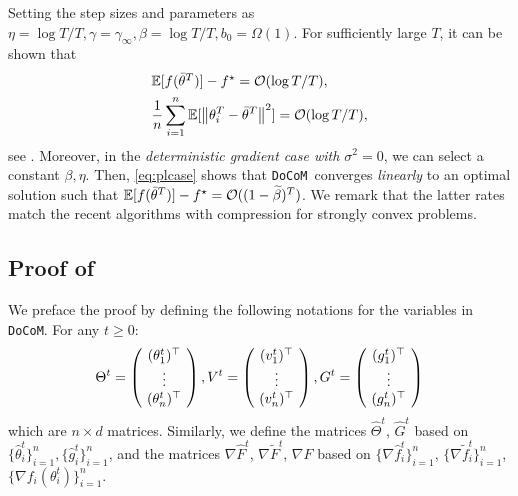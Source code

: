 \documentclass[10pt]{article} %
\theoremstyle{plain}
\theoremstyle{definition}
\theoremstyle{remark}
\newcommand{\aname}{{\tt DoCoM}}
\newcommand{\RR}{\mathbb{R}}
\newcommand{\prm}{\theta}
\newcommand{\gog}{g}
\newcommand{\hatgog}{\widehat{\gog}}
\newcommand{\grdF}{\nabla F}
\newcommand{\avgtheta}{\bar{\prm}}
\newcommand{\norm}[1]{\left\| #1 \right\|}
\newcommand{\ve}{v}
\newcommand{\stocgrdf}{\nabla \widehat{f}}
\newcommand{\stocgrdfp}{\nabla \widetilde{f}}
\newcommand{\stocgrdF}{\nabla \widehat{F}}
\newcommand{\stocgrdFp}{\nabla \widetilde{F}}
\newcommand{\hatTheta}{\widehat{\Theta}}
\newcommand{\hatG}{\widehat{G}}
\newcommand{\bmu}{\widetilde{\beta}}
\begin{document}
Setting the step sizes and parameters as $\eta = \log T/T, \gamma = \gamma_\infty, \beta = \log T /T, b_0 = \Omega(1)$. For sufficiently large $T$, it can be shown that \vspace{-.05cm}
\begin{align}
    & \textstyle \mathbb{E} [ f( \avgtheta^T )] - f^\star = {\cal O}( \log T /T ), \\
    & \frac{1}{n} \sum_{i=1}^n \mathbb{E} [ \norm{\theta_i^T - \avgtheta^T}^2 ] = {\cal O}( \log T /T ), \label{eq:epsreq1}\vspace{-.05cm}
\end{align}
see .
Moreover, in the \emph{deterministic gradient case with $\sigma^2 = 0$}, we can select a constant $\beta, \eta$. Then, \eqref{eq:plcase} shows that \aname~converges \emph{linearly} to an optimal solution such that $\mathbb{E} [ f( \avgtheta^T )] - f^\star = {\cal O}( (1-\bmu)^T )$. 
We remark that the latter rates match the  recent algorithms with compression \citep{liu2020linear, liao2021compressed, song2021compressed, kovalev2021linearly} for strongly convex problems.\vspace{-.1cm}

\subsection{Proof of }\label{sec:pf} 
We preface the proof by defining the following notations for the variables in \aname. For any $t \geq 0$: \vspace{-.0cm}
\begin{align*}
    \Theta^t = \left(\hspace{-.05cm} \begin{array}{c}
        (\theta_1^t)^\top \\
        \vdots \\
        (\theta_n^t)^\top 
    \end{array} \hspace{-.05cm}\right),
    V^t = \left(\hspace{-.05cm} \begin{array}{c}
        (\ve_1^t)^\top \\
        \vdots \\
        (\ve_n^t)^\top 
    \end{array} \hspace{-.05cm}\right),
    G^t = \left(\hspace{-.05cm} \begin{array}{c}
        (g_1^t)^\top \\
        \vdots \\
        (g_n^t)^\top 
    \end{array} \hspace{-.05cm}\right)
\end{align*} 
which are $n \times d$ matrices. 
Similarly, we define the matrices $\hatTheta^t$, $\hatG^t$ based on $\{ \hat{\theta}_i^t \}_{i=1}^n, \{ \hatgog_i^t \}_{i=1}^n$, and the matrices $\stocgrdF^t$, $\stocgrdFp^t$, $\grdF$  based on $\{ \stocgrdf_i^t \}_{i=1}^n$, $\{ \stocgrdfp_i^t \}_{i=1}^n$, $\{ \nabla f_i( \theta_i^t ) \}_{i=1}^n$. 
\end{document}
